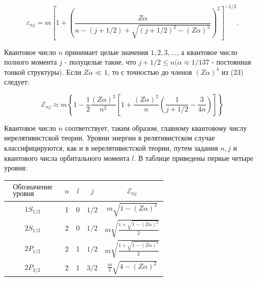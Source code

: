 \documentclass[10pt]{article}
\begin{document}
\[

\varepsilon_{n j}=m\left[1+\left(\frac{Z \alpha}{n-(j+1 / 2)+\sqrt{(j+1 / 2)^{2}-(Z \alpha)^{2}}}\right)^{2}\right]^{-1 / 2} .

\]



Квантовое число $n$ принимает целые значения $1,2,3, \ldots$, а квантовое число полного момента $j$ - полуцелые такие, что $j+1 / 2 \leqslant n(\alpha \approx 1 / 137$ - постоянная тонкой структуры). Если $Z \alpha \ll 1$, то с точностью до членов $(Z \alpha)^{4}$ из (23) следует:



\[

\mathscr{E}_{n j} \approx m\left\{1-\frac{1}{2} \frac{(Z \alpha)^{2}}{n^{2}}\left[1+\frac{(Z \alpha)^{2}}{n}\left(\frac{1}{j+1 / 2}-\frac{3}{4 n}\right)\right]\right\}

\]



Квантовое число $n$ соответствует, таким образом, главному квантовому числу нерелятивистской теории. Уровни энергии в релятивистском случае классифицируются, как и в нерелятивистской теории, путем задания $n, j$ и квантового числа орбитального момента $l$. В таблице приведены первые четыре уровня:



\begin{center}

\begin{tabular}{|c|c|c|c|c|}

\hline

$\begin{array}{c}\text { Обозначение } \\ \text { уровня }\end{array}$ & $n$ & $l$ & $j$ & $\mathscr{E}_{n j}$ \\

\hline

$1 S_{1 / 2}$ & 1 & 0 & $1 / 2$ & $m \sqrt{1-(Z \alpha)^{2}}$ \\

\hline

$2 S_{1 / 2}$ & 2 & 0 & $1 / 2$ & $m \sqrt{\frac{1+\sqrt{1-(Z \alpha)^{2}}}{2}}$ \\

\hline

$2 P_{1 / 2}$ & 2 & 1 & $1 / 2$ & $m \sqrt{\frac{1+\sqrt{1-(Z \alpha)^{2}}}{2}}$ \\

\hline

$2 P_{3 / 2}$ & 2 & 1 & $3 / 2$ & $\frac{m}{2} \sqrt{4-(Z \alpha)^{2}}$ \\

\hline

\end{tabular}

\end{center}
\end{document}
